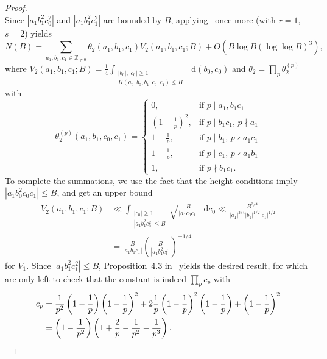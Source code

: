 \documentclass[a4paper, twoside, 10pt]{amsart}
\newcommand*\diff{\mathop{}\!\mathrm{d}}
\newcommand{\ZZnz}{\mathbb{Z}_{\neq{}0}}
\newcommand{\abs}[1]{\left\lvert#1\right\rvert}
\theoremstyle{definition}
\begin{document}
\begin{proof}
\[  \]
  Since $\abs{a_1b_1^2c_0^2}$ and $\abs{a_1b_1^2c_1^2}$ are bounded by $B$, applying~\cite[Prop.~3.9]{MR2520770} once more (with $r=1$, $s=2$) yields
  \[
    N(B)=\sum_{a_1,b_1,c_1\in\ZZnz} \theta_2(a_1,b_1,c_1) V_2(a_1,b_1,c_1;B) +O(B\log B(\log\log B)^3)\text{,}
  \]
  where $V_2(a_1,b_1,c_1;B) = \frac{1}{4}\int_{\substack{\abs{b_0},\abs{c_0}\geq 1 \\ H(a_0,b_0,b_1,c_0,c_1)\leq B}} \diff(b_0,c_0)$
  and $\theta_2=\prod_p\theta_2^{(p)}$ with
  \[
    \theta_2^{(p)}(a_1,b_1,c_0,c_1) = \begin{cases}
      0, & \text{if } p \mid a_1, b_1 c_1\\
      \left(1-\frac{1}{p}\right)^2,
        & \text{if } p\mid b_1c_1 \text{, } p\nmid a_1 \\
      1-\frac{1}{p},
        & \text{if } p \mid b_1\text{, } p\nmid a_1c_1 \\
      1-\frac{1}{p},
          & \text{if } p \mid c_1\text{, } p\nmid a_1b_1 \\
      1, & \text{if } p \nmid b_1c_1 \text{.}
    \end{cases}
  \]
  To complete the summations, we use the fact that the height conditions imply $\abs{a_1b_0^2c_0c_1}\leq B$, and get an upper bound
  \begin{align*}
    V_2(a_1,b_1,c_1;B) &\ll \int_{\substack{\abs{c_0}\geq 1 \\ \abs{a_1b_1^2c_0^2}\leq B}}  \sqrt{\frac{B}{\abs{a_1c_0c_1}}} \diff c_0  \ll \frac{B^{3/4}}{\abs{a_1}^{3/4}\abs{b_1}^{1/2}\abs{c_1}^{1/2}} \\
    & = \frac{B}{\abs{a_1b_1c_1}} \left(\frac{B}{\abs{a_1b_1^2c_1^2}}\right)^{-1/4}
  \end{align*}
  for $V_1$. Since $\abs{a_1b_1^2c_1^2}\leq B$, Proposition~4.3 in~\cite{MR2520770} yields the desired result, for which are only left to check that the constant is indeed $\prod_p c_p$ with
  \begin{align*}
    c_p &= \frac{1}{p^2} \left(1-\frac{1}{p}\right) \left(1-\frac{1}{p}\right)^2 +
    2\frac{1}{p} \left(1-\frac{1}{p}\right)^2 \left(1-\frac{1}{p}\right) +
    \left(1-\frac{1}{p}\right)^2 \\
    & = \left(1-\frac{1}{p^2}\right)
    \left(1+\frac{2}{p}-\frac{1}{p^2}-\frac{1}{p^3} \right). \qedhere
  \end{align*}
\end{proof}
\end{document}

